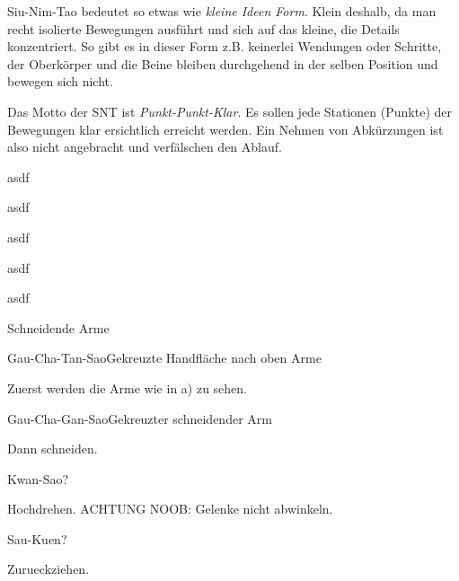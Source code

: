 Siu-Nim-Tao bedeutet so etwas wie \textit{kleine Ideen Form}. Klein deshalb, da man recht isolierte Bewegungen ausf\"uhrt und sich auf das kleine, die Details konzentriert. So gibt es in dieser Form z.B. keinerlei Wendungen oder Schritte, der Oberk\"orper und die Beine bleiben durchgehend in der selben Position und bewegen sich nicht.

Das Motto der SNT ist \textit{Punkt-Punkt-Klar}. Es sollen jede Stationen (Punkte) der Bewegungen klar ersichtlich erreicht werden. Ein Nehmen von Abk\"urzungen ist also nicht angebracht und verf\"alschen den Ablauf.
 


asdf

asdf

asdf

asdf

asdf

\begin{WTSatz}{Schneidende Arme}%

	\begin{WTSatzTeil}{Gau-Cha-Tan-Sao}{Gekreuzte Handfl\"ache nach oben Arme}
		
		Zuerst werden die Arme wie in a) zu sehen.
	\end{WTSatzTeil}
	
	\begin{WTSatzTeil}{Gau-Cha-Gan-Sao}{Gekreuzter schneidender Arm}
		
		Dann schneiden.
	\end{WTSatzTeil}
	
	\begin{WTSatzTeil}{Kwan-Sao}{?}
		
		Hochdrehen. ACHTUNG NOOB: Gelenke nicht abwinkeln.
	\end{WTSatzTeil}
	
	\begin{WTSatzTeil}{Sau-Kuen}{?}
		
		Zurueckziehen.
	\end{WTSatzTeil}

\end{WTSatz}


